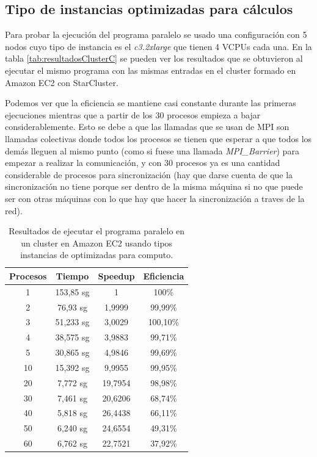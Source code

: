\documentclass{article}
\begin{document}
\subsection{Tipo de instancias optimizadas para cálculos}\label{sec:ejC3}
	Para probar la ejecución del programa paralelo se usado una configuración con 5 nodos cuyo tipo de instancia es el \emph{c3.2xlarge} que tienen 4 VCPUs cada una. En la tabla \ref{tab:resultadosClusterC} se pueden ver los resultados que se obtuvieron al ejecutar el mismo programa con las mismas entradas en el cluster formado en Amazon EC2 con StarCluster.

	Podemos ver que la eficiencia se mantiene casi constante durante las primeras ejecuciones mientras que  a partir de los 30 procesos empieza a bajar considerablemente. Esto se debe a que las llamadas que se usan de MPI son llamadas colectivas donde todos los procesos se tienen que esperar a que todos los demás lleguen al mismo punto (como si fuese una llamada \emph{MPI\_Barrier}) para empezar a realizar la comunicación, y con 30 procesos ya es una cantidad considerable de procesos para sincronización (hay que darse cuenta de que la sincronización no tiene porque ser dentro de la misma máquina si no que puede ser con otras máquinas con lo que hay que hacer la sincronización a traves de la red).

\begin{table}[h]
	\begin{center}
		\caption{Resultados de ejecutar el programa paralelo en un cluster en Amazon EC2 usando tipos instancias de optimizadas para computo.}
		\begin{tabular}{|c|c|c|c|}
\hline
\textbf{Procesos} &
\textbf{Tiempo} &
\textbf{Speedup} &
\textbf{Eficiencia} \\ \hline
\hline
 1 &153,85 sg &  1          & 100\% \\ \hline
 2 & 76,93 sg &  1,9999 & 99,99\% \\ \hline 
 3 & 51,233 sg &  3,0029 & 100,10\% \\ \hline 
 4 & 38,575 sg &  3,9883 & 99,71\% \\ \hline
 5 & 30,865 sg &  4,9846 & 99,69\% \\ \hline
10 & 15,392 sg &  9,9955 & 99,95\% \\ \hline
20 & 7,772 sg & 19,7954 & 98,98\% \\ \hline
30 & 7,461 sg &  20,6206& 68,74\% \\ \hline
40 & 5,818 sg & 26,4438 & 66,11\% \\ \hline
50 & 6,240 sg & 24,6554 & 49,31\% \\ \hline
60 & 6,762 sg & 22,7521 & 37,92\% \\ \hline
		\end{tabular}
		\label{tab:resultadosClusterM}
	\end{center}
\end{table}
\end{document}
